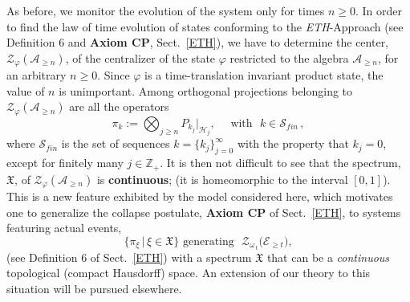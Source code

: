 \documentclass[12pt]{article}
\begin{document}
{As before, we monitor the evolution of the system only for times $n\geq 0$. In order to find the law of time evolution of 
states conforming to the \textit{ETH}-Approach (see Definition 6 and {\bf{Axiom CP}}, Sect.~\ref{ETH}), we have to 
determine the center, $\mathcal{Z}_{\varphi}(\mathcal{A}_{\geq n})$, of the centralizer of the state $\varphi$ 
restricted to the algebra $\mathcal{A}_{\geq n}$, for an arbitrary $n\geq 0$. Since $\varphi$ is a time-translation 
invariant product state, the value of $n$ is unimportant. Among orthogonal projections belonging to 
$\mathcal{Z}_{\varphi}(\mathcal{A}_{\geq n})$ are all the operators
\begin{equation}\label{central proj}
\pi_{{k}} := \bigotimes_{j\geq n} P_{k_j}\vert_{\mathcal{H}_j}, \quad \text{  with  }\,\,{k}\in \mathcal{S}_{fin}\,,
\end{equation}
where $\mathcal{S}_{fin}$ is the set of sequences ${k}=\big\{k_j\big\}_{j=0}^{\infty}$ with the property that 
$k_j =0$, except for finitely many $j\in \mathbb{Z}_{+}$.
It is then not difficult to see that the spectrum, $\mathfrak{X}$, of $\mathcal{Z}_{\varphi}(\mathcal{A}_{\geq n})$ 
is {\bf{continuous}}; (it is homeomorphic to the interval $[0,1]$). This is a new feature exhibited by the model considered 
here, which motivates one to generalize the collapse postulate, {\bf{Axiom CP}} of Sect.~\ref{ETH}, to systems 
featuring actual events, 
$$\big\{ \pi_{\xi}\,\vert \,\xi \in \mathfrak{X} \big\} \,\,\text{generating   }\,\, \mathcal{Z}_{\omega_{\,t}}\big(\mathcal{E}_{\geq t}\big),$$
(see Definition 6 of Sect.~\ref{ETH}) with a spectrum $\mathfrak{X}$ that can be a \textit{continuous} topological (compact Hausdorff) space. An extension of our theory to this situation will be pursued elsewhere.

}
\end{document}

